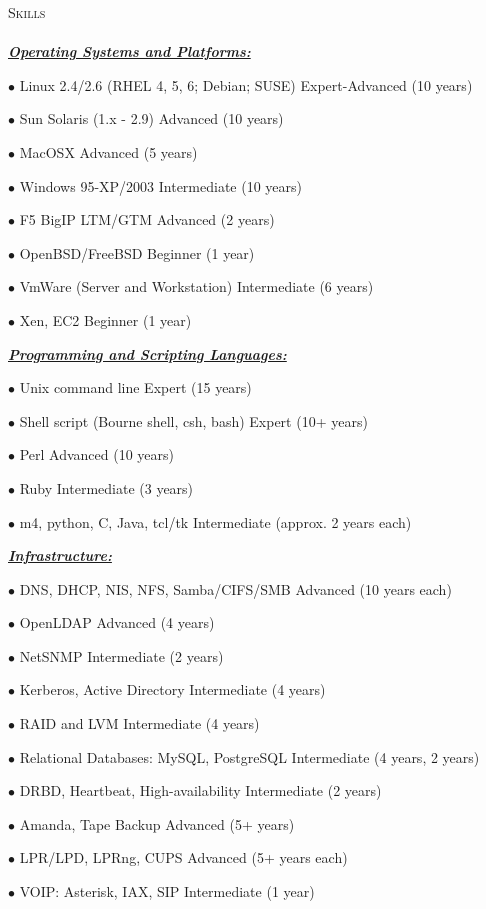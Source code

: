 \documentclass{article}
\newcommand{\lineunder}{\vspace*{-8pt} \\ \hspace*{-18pt} \hrulefill \\}
\newcommand{\header}[1]{{\hspace*{-15pt}\vspace*{6pt} \textsc{#1}} \vspace*{-6pt} \lineunder}
\newcommand{\skillset}[1]{{ \underline{\textbf{\emph{#1}}}\\  \nopagebreak }}
\newcommand{\skill}[2]{{$\bullet$ #1 \hfill #2 }}
\begin{document}
\header{Skills}

\skillset{Operating Systems and Platforms: }

\skill{Linux 2.4/2.6 (RHEL 4, 5, 6; Debian; SUSE)}{Expert-Advanced (10 years)}

\skill{Sun Solaris (1.x - 2.9)}{Advanced (10 years)}

\skill{MacOSX}{Advanced (5 years)}

\skill{Windows 95-XP/2003}{Intermediate (10 years)}

\skill{F5 BigIP LTM/GTM}{Advanced (2 years)}

\skill{OpenBSD/FreeBSD}{Beginner (1 year)}

\skill{VmWare (Server and Workstation)}{Intermediate (6 years)}

\skill{Xen, EC2}{Beginner (1 year)}



\skillset{Programming and Scripting Languages: }

\skill{Unix command line}{Expert (15 years)}

\skill{Shell script (Bourne shell, csh, bash)}{Expert (10+ years)}

\skill{Perl}{Advanced (10 years)}

\skill{Ruby}{Intermediate (3 years)}

\skill{m4, python, C, Java, tcl/tk}{Intermediate (approx. 2 years each)}



\skillset{Infrastructure: }

\skill{DNS, DHCP, NIS, NFS, Samba/CIFS/SMB}{Advanced (10 years each)}

\skill{OpenLDAP}{Advanced (4 years)}

\skill{NetSNMP}{Intermediate (2 years)}

\skill{Kerberos, Active Directory}{Intermediate (4 years)}

\skill{RAID and LVM}{Intermediate (4 years)}

\skill{Relational Databases: MySQL, PostgreSQL}{Intermediate (4 years, 2 years)}

\skill{DRBD, Heartbeat, High-availability}{Intermediate (2 years)}

\skill{Amanda, Tape Backup}{Advanced (5+ years)}

\skill{LPR/LPD, LPRng, CUPS}{Advanced (5+ years each)}

\skill{VOIP: Asterisk, IAX, SIP}{Intermediate (1 year)}
\end{document}

